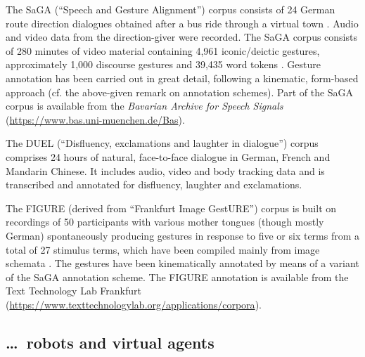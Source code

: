 \documentclass[output=paper
                ,modfonts
                ,nonflat
	        ,collection
	        ,collectionchapter
	        ,collectiontoclongg
 	        ,biblatex
                ,babelshorthands
                ,newtxmath
                ,draftmode
                ,colorlinks, citecolor=brown
]{./langsci/langscibook}
\begin{document}
The SaGA (\enquote{Speech and Gesture Alignment}) corpus  consists of 24 German route direction dialogues obtained after a bus ride through a virtual town \citep{Luecking:Bergmann:Hahn:Kopp:Rieser:2010}. 
%
Audio and video data from the direction-giver were recorded. 
%
The SaGA corpus consists of 280 minutes of video material containing 4,961 iconic/deictic gestures, approximately 1,000 discourse gestures and 39,435 word tokens \citep{Luecking:Bergmann:Hahn:Kopp:Rieser:2013}.
%
Gesture annotation has been carried out in great detail, following a kinematic, form-based approach (cf. the above-given remark on annotation schemes).
%
Part of the SaGA corpus is available from the \textit{Bavarian Archive for Speech Signals} (\url{https://www.bas.uni-muenchen.de/Bas}).


The DUEL (\enquote{Disfluency, exclamations and laughter in dialogue}) corpus  \citep{Hough:Tian:de:Ruiter:Betz:Kousidis:Schlangen:Ginzburg:2016} comprises 24 hours of natural, face-to-face dialogue in German, French and Mandarin Chinese.
%
It includes audio, video and body tracking data and is transcribed and annotated for disfluency, laughter and exclamations.


The FIGURE (derived from \enquote{Frankfurt Image GestURE}) corpus  \citep{Luecking:Mehler:Walther:Mauri:Kurfuerst:2016} is built on recordings of 50 participants with various mother tongues (though mostly German) spontaneously producing gestures in response to five or six terms from a total of 27 stimulus terms, which have been compiled mainly from image schemata \citep{Lakoff87a-u}.
%
The gestures have been kinematically annotated by means of a variant of the SaGA annotation scheme.
%
The FIGURE annotation is available from the Text Technology Lab Frankfurt (\url{https://www.texttechnologylab.org/applications/corpora}).



\subsection{\ldots\ robots and virtual agents}
\label{sec:virtual-agents}
\end{document}
